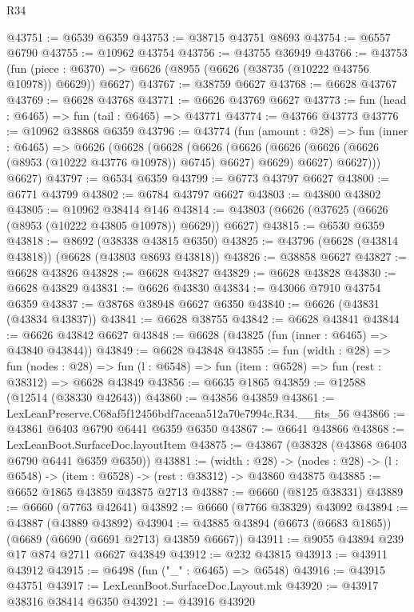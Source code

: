 \begin{lexlean}{R34}
\begin{coremodule}
@43751 := @6539 @6359
@43753 := @38715 @43751 @8693
@43754 := @6557 @6790
@43755 := @10962 @43754
@43756 := @43755 @36949
@43766 := @43753
    (fun (piece : @6370) => @6626 (@8955 (@6626 (@38735 (@10222 @43756 @10978)) @6629)) @6627)
@43767 := @38759 @6627
@43768 := @6628 @43767
@43769 := @6628 @43768
@43771 := @6626 @43769 @6627
@43773 := fun (head : @6465) => fun (tail : @6465) => @43771
@43774 := @43766 @43773
@43776 := @10962 @38868 @6359
@43796 := @43774
    (fun (amount : @28) =>
    fun (inner : @6465) =>
    @6626
      (@6628
        (@6628
          (@6626
            (@6626 (@6626 (@6626 (@6626 (@8953 (@10222 @43776 @10978)) @6745) @6627) @6629) @6627)
            @6627)))
      @6627)
@43797 := @6534 @6359
@43799 := @6773 @43797 @6627
@43800 := @6771 @43799
@43802 := @6784 @43797 @6627
@43803 := @43800 @43802
@43805 := @10962 @38414 @146
@43814 := @43803 (@6626 (@37625 (@6626 (@8953 (@10222 @43805 @10978)) @6629)) @6627)
@43815 := @6530 @6359
@43818 := @8692 (@38338 @43815 @6350)
@43825 := @43796 (@6628 (@43814 @43818)) (@6628 (@43803 @8693 @43818))
@43826 := @38858 @6627
@43827 := @6628 @43826
@43828 := @6628 @43827
@43829 := @6628 @43828
@43830 := @6628 @43829
@43831 := @6626 @43830
@43834 := @43066 @7910 @43754 @6359
@43837 := @38768 @38948 @6627 @6350
@43840 := @6626 (@43831 (@43834 @43837))
@43841 := @6628 @38755
@43842 := @6628 @43841
@43844 := @6626 @43842 @6627
@43848 := @6628 (@43825 (fun (inner : @6465) => @43840 @43844))
@43849 := @6628 @43848
@43855 := fun (width : @28) =>
  fun (nodes : @28) => fun (l : @6548) => fun (item : @6528) => fun (rest : @38312) => @6628 @43849
@43856 := @6635 @1865
@43859 := @12588 (@12514 (@38330 @42643))
@43860 := @43856 @43859
@43861 := LexLeanPreserve.C68af5f12456bdf7aceaa512a70e7994c.R34.__fits_56
@43866 := @43861 @6403 @6790 @6441 @6359 @6350
@43867 := @6641 @43866
@43868 := LexLeanBoot.SurfaceDoc.layoutItem
@43875 := @43867 (@38328 (@43868 @6403 @6790 @6441 @6359 @6350))
@43881 := (width : @28) ->
  (nodes : @28) -> (l : @6548) -> (item : @6528) -> (rest : @38312) -> @43860 @43875
@43885 := @6652 @1865 @43859 @43875 @2713
@43887 := @6660 (@8125 @38331)
@43889 := @6660 (@7763 @42641)
@43892 := @6660 (@7766 @38329) @43092
@43894 := @43887 (@43889 @43892)
@43904 := @43885 @43894 (@6673 (@6683 @1865)) (@6689 (@6690 (@6691 @2713) @43859 @6667))
@43911 := @9055 @43894 @239 @17 @874 @2711 @6627 @43849
@43912 := @232 @43815
@43913 := @43911 @43912
@43915 := @6498 (fun ("_" : @6465) => @6548)
@43916 := @43915 @43751
@43917 := LexLeanBoot.SurfaceDoc.Layout.mk
@43920 := @43917 @38316 @38414 @6350
@43921 := @43916 @43920

\end{coremodule}
\end{lexlean}
